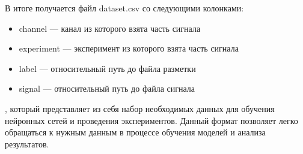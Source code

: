 В итоге получается файл dataset.csv со следующими колонками:

\begin{itemize}
	\item channel --- канал из которого взята часть сигнала
	\item experiment --- эксперимент из которого взята часть сигнала
	\item label --- относительный путь до файла разметки
	\item signal --- относительный путь до файла сигнала
\end{itemize}

\noindent, который представляет из себя набор необходимых данных для обучения
нейронных сетей и проведения экспериментов. Данный формат позволяет легко
обращаться к нужным данным в процессе обучения моделей и анализа результатов.

